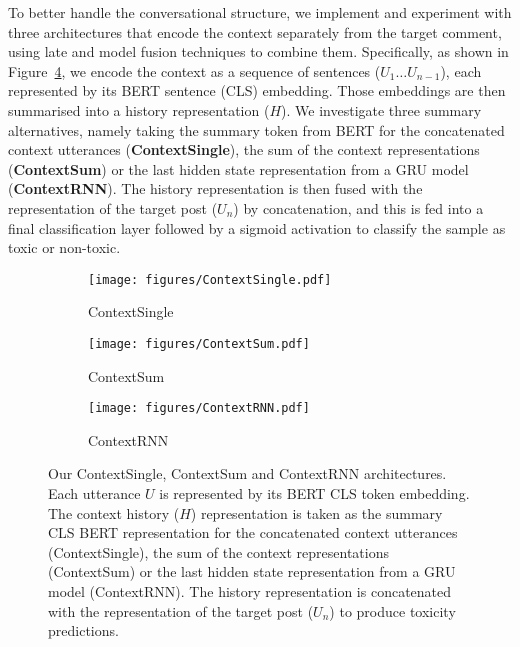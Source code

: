 \documentclass[acmsmall]{acmart}
\begin{document}
To better handle the conversational structure, we implement and experiment with three architectures that encode the context separately from the target comment, using late and model fusion techniques to combine them. Specifically, as shown in Figure~\ref{fig:context-architecture}, we encode the context as a sequence of sentences ($U_{1} \dots U_{n-1}$), each represented by its BERT sentence (CLS) embedding. Those embeddings are then summarised into a history representation ($H$). We investigate three summary alternatives, namely taking the summary token from BERT for the concatenated context utterances ({\bf ContextSingle}), the sum of the context representations ({\bf ContextSum}) or the last hidden state representation from a GRU model ({\bf ContextRNN}). The history representation is then fused with the representation of the target post ($U_n$) by concatenation, and this is fed into a final classification layer followed by a sigmoid activation to  classify the sample as toxic or non-toxic. 

\begin{figure}[!h]
\begin{subfigure}{0.33\textwidth}
  \texttt{[image: figures/ContextSingle.pdf]}
  \caption{ContextSingle}
  \label{fig:contextsingle}
\end{subfigure}\begin{subfigure}{0.33\textwidth}
  \texttt{[image: figures/ContextSum.pdf]}
  \caption{ContextSum}
  \label{fig:contextsum}
\end{subfigure}
\begin{subfigure}{0.33\textwidth}
  \texttt{[image: figures/ContextRNN.pdf]}
  \caption{ContextRNN}
  \label{fig:contextrnn}
\end{subfigure}
\caption{Our ContextSingle, ContextSum and ContextRNN architectures. Each utterance $U$ is represented by its BERT CLS token embedding. The context history ($H$) representation is taken as the summary CLS BERT representation for the concatenated context utterances (ContextSingle), the sum of the context representations (ContextSum) or the last hidden state representation from a GRU model (ContextRNN). The history representation is concatenated with the representation of the target post ($U_n$) to produce toxicity predictions.}
\label{fig:context-architecture}
\end{figure}
\end{document}
